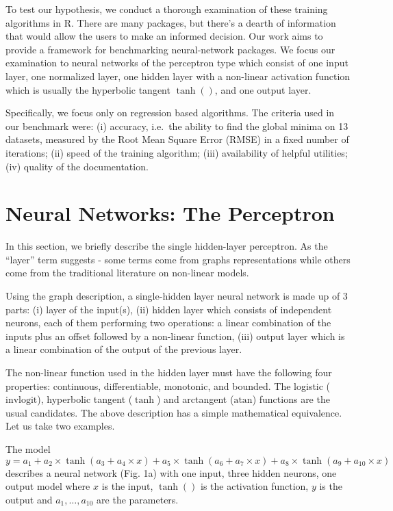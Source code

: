 To test our hypothesis, we conduct a thorough examination of these
training algorithms in R. There are many packages, but there's a dearth
of information that would allow the users to make an informed decision.
Our work aims to provide a framework for benchmarking neural-network
packages. We focus our examination to neural networks of the perceptron
type which consist of one input layer, one normalized layer, one hidden
layer with a non-linear activation function which is usually the
hyperbolic tangent \(\tanh()\), and one output layer.

Specifically, we focus only on regression based algorithms. The criteria
used in our benchmark were: (i) accuracy, i.e.~the ability to find the
global minima on 13 datasets, measured by the Root Mean Square Error
(RMSE) in a fixed number of iterations; (ii) speed of the training
algorithm; (iii) availability of helpful utilities; (iv) quality of the
documentation.

\hypertarget{neural-networks-the-perceptron}{%
\section{Neural Networks: The
Perceptron}\label{neural-networks-the-perceptron}}

In this section, we briefly describe the single hidden-layer perceptron.
As the ``layer'' term suggests - some terms come from graphs
representations while others come from the traditional literature on
non-linear models.

Using the graph description, a single-hidden layer neural network is
made up of 3 parts: (i) layer of the input(s), (ii) hidden layer which
consists of independent neurons, each of them performing two operations:
a linear combination of the inputs plus an offset followed by a
non-linear function, (iii) output layer which is a linear combination of
the output of the previous layer.

The non-linear function used in the hidden layer must have the following
four properties: continuous, differentiable, monotonic, and bounded. The
logistic (\(\text{invlogit}\)), hyperbolic tangent (\(\tanh\)) and
arctangent (\(\text{atan}\)) functions are the usual candidates. The
above description has a simple mathematical equivalence. Let us take two
examples.

The model
\(y = a_1 + a_2\times \tanh(a_3 + a_4\times x) + a_5\times \tanh(a_6 + a_7\times x) + a_8\times \tanh(a_9 + a_{10}\times x)\)
describes a neural network (Fig. 1a) with one input, three hidden
neurons, one output model where \(x\) is the input, \(\tanh()\) is the
activation function, \(y\) is the output and \(a_1,\dots,a_{10}\) are
the parameters.

